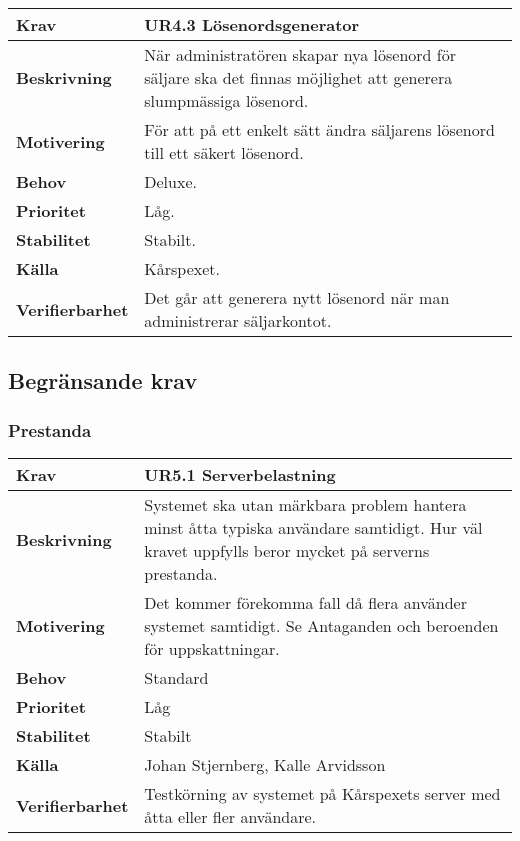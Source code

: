 \documentclass[a4paper, twoside, 11pt, titlepage]{article}
\begin{document}
		\begin{tabular} { p{2.6cm} p{12.5cm} }
			\hline
			\sffamily\textbf{Krav} & \sffamily\textbf{UR4.3 Lösenordsgenerator  } \\
			\hline
			\sffamily\textbf{Beskrivning} & När administratören skapar nya lösenord för säljare ska det finnas möjlighet att generera slumpmässiga lösenord.  \\
			\hline
			\sffamily\textbf{Motivering} & För att på ett enkelt sätt ändra säljarens lösenord till ett säkert lösenord.  \\
			\hline
			\sffamily\textbf{Behov} & Deluxe.  \\
			\hline
			\sffamily\textbf{Prioritet} & Låg.  \\
			\hline
			\sffamily\textbf{Stabilitet} & Stabilt.  \\
			\hline
			\sffamily\textbf{Källa} & Kårspexet.  \\
			\hline
			\sffamily\textbf{Verifierbarhet} & Det går att generera nytt lösenord när man administrerar säljarkontot.  \\
			\hline
		\end{tabular}


	\subsection{Begränsande krav}



		\subsubsection{Prestanda}


		\begin{tabular} { p{2.6cm} p{12.5cm} }
			\hline
			\sffamily\textbf{Krav} & \sffamily\textbf{UR5.1 Serverbelastning } \\
			\hline
			\sffamily\textbf{Beskrivning} & Systemet ska utan märkbara problem hantera minst åtta typiska användare samtidigt. Hur väl kravet uppfylls beror mycket på serverns prestanda.  \\
			\hline
			\sffamily\textbf{Motivering} & Det kommer förekomma fall då flera använder systemet samtidigt. Se Antaganden och beroenden för uppskattningar.  \\
			\hline
			\sffamily\textbf{Behov} & Standard  \\
			\hline
			\sffamily\textbf{Prioritet} & Låg  \\
			\hline
			\sffamily\textbf{Stabilitet} & Stabilt  \\
			\hline
			\sffamily\textbf{Källa} & Johan Stjernberg, Kalle Arvidsson  \\
			\hline
			\sffamily\textbf{Verifierbarhet} & Testkörning av systemet på Kårspexets server med åtta eller fler användare.  \\
			\hline
		\end{tabular}
		\vspace{6mm}
\end{document}
